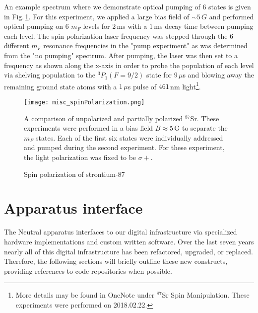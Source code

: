 An example spectrum where we demonstrate optical pumping of 6 states is given in Fig.\,\ref{fig:spinPolSpectra}. 
For this experiment, we applied a large bias field of $\sim5\,G$ and performed optical pumping on 6 $m_F$ levels for 2\,ms with a $1\,$ms decay time between pumping each level.
The spin-polarization laser frequency was stepped through the 6 different $m_F$ resonance frequencies in the "pump experiment" as was determined from the "no pumping" spectrum.
After pumping, the laser was then set to a frequency as shown along the x-axis in order to probe the population of each level via shelving population to the $^3P_1 (F=9/2)$ state for $9\,\mu$s and blowing away the remaining ground state atoms with a $1\,\mu$s pulse of $461\,$nm light\footnote{More details may be found in OneNote under $^{87}$Sr Spin Manipulation. These experiments were performed on 2018.02.22.}.
	\begin{figure}
	\centerline{
		\texttt{[image: misc\_spinPolarization.png]}}
		\caption{Spin polarization of strontium-87}{A comparison of unpolarized and partially polarized $^{87}$Sr. These experiments were performed in a bias field $B\approx5\,$G to separate the $m_F$ states. Each of the first six states were individually addressed and pumped during the second experiment. For these experiment, the light polarization was fixed to be $\sigma+$.}
		 \label{fig:spinPolSpectra}
	\end{figure}



\newpage
\section{Apparatus interface} \label{sec:electronics}
\setcounter{footnote}{0}
The Neutral apparatus interfaces to our digital infrastructure via specialized hardware implementations and custom written software.
Over the last seven years nearly all of this digital infrastructure has been refactored, upgraded, or replaced.
Therefore, the following sections will briefly outline these new constructs, providing references to code repositories when possible.

